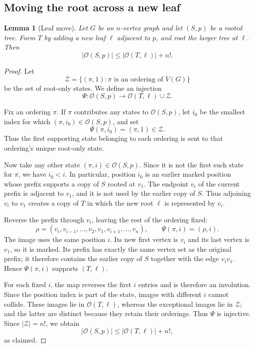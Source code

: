 \documentclass[11pt]{article}
\numberwithin{equation}{section}
\newtheorem{lemma}[theorem]{Lemma}
\theoremstyle{definition}
\newcommand{\cO}{\mathcal O}
\newcommand{\cZ}{\mathcal Z}
\begin{document}
\subsection{Moving the root across a new leaf}

\begin{lemma}[Leaf move]\label{lem:leaf}
Let $G$ be an $n$-vertex graph and let $(S,p)$ be a rooted tree.  Form $T$
by adding a new leaf $\ell$ adjacent to $p$, and root the larger tree at
$\ell$.  Then
\[
        |\cO(S,p)|\leq|\cO(T,\ell)|+n!.
\]
\end{lemma}

\begin{proof}
Let
\[
        \cZ=\{(\pi,1):\pi\text{ is an ordering of }V(G)\}
\]
be the set of root-only states.  We define an injection
\[
        \Psi:\cO(S,p)\longrightarrow \cO(T,\ell)\cup\cZ.
\]

Fix an ordering $\pi$.  If $\pi$ contributes any states to $\cO(S,p)$,
let $i_0$ be the smallest index for which $(\pi,i_0)\in\cO(S,p)$, and set
\[
        \Psi(\pi,i_0)=(\pi,1)\in\cZ.
\]
Thus the first supporting state belonging to each ordering is sent to that
ordering's unique root-only state.

Now take any other state $(\pi,i)\in\cO(S,p)$.  Since it is not the first
such state for $\pi$, we have $i_0<i$.  In particular, position $i_0$ is an
earlier marked position whose prefix supports a copy of $S$ rooted at $v_1$.
The endpoint $v_i$ of the current prefix is adjacent to $v_1$, and it is
not used by the earlier
copy of $S$.  Thus adjoining $v_i$ to $v_1$ creates a copy of $T$ in which
the new root $\ell$ is represented by $v_i$.

Reverse the prefix through $v_i$, leaving the rest of the ordering fixed:
\begin{equation}
 \rho=(v_i,v_{i-1},\ldots,v_2,v_1,
               v_{i+1},\ldots,v_n),
 \qquad
 \Psi(\pi,i)=(\rho,i).
\label{eq:reversal}
\end{equation}
The image uses the same position $i$.  Its new first vertex is $v_i$ and its
last vertex is $v_1$, so it is marked.  Its prefix has exactly the same
vertex set as the original prefix; it therefore contains the earlier copy
of $S$ together with the edge $v_iv_1$.  Hence $\Psi(\pi,i)$ supports
$(T,\ell)$.

For each fixed $i$, the map reverses the first $i$ entries and is therefore
an involution.  Since the position index is part of the state, images with
different $i$ cannot collide.  These images lie in $\cO(T,\ell)$, whereas
the exceptional images lie in $\cZ$; and the latter are distinct because
they retain their orderings.  Thus $\Psi$ is injective.  Since
$|\cZ|=n!$, we obtain
\[
        |\cO(S,p)|\leq|\cO(T,\ell)|+n!,
\]
as claimed.
\end{proof}
\end{document}

